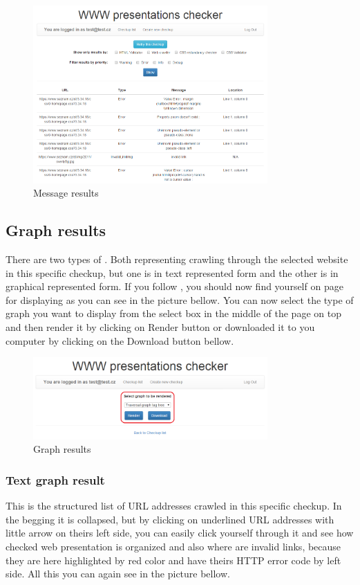 \documentclass[12pt,a4paper]{article}
\begin{document}
\begin{figure}[H]
    \centering
    \includegraphics[width=0.8\textwidth]{pictures/messages.png}
		\caption{Message results}
		\label{fig:messages}
\end{figure}

\subsection{Graph results} \label{graph}
There are two types of . Both representing crawling through the selected website in this specific checkup, but one  is in text represented form and the other  is in graphical represented form. If you follow , you should now find yourself on page for displaying  as you can see in the picture bellow. You can now select the type of graph you want to display from the select box in the middle of the page on top and then render it by clicking on Render button or downloaded it to you computer by clicking on the Download button bellow.

\begin{figure}[H]
    \centering
    \includegraphics[width=0.8\textwidth]{pictures/graph.png}
		\caption{Graph results}
		\label{fig:graph}
\end{figure}

\subsubsection{Text graph result} \label{text}
This is the structured list of URL addresses crawled in this specific checkup. In the begging it is collapsed, but by clicking on underlined URL addresses with little arrow on theirs left side, you can easily click yourself through it and see how checked web presentation is organized and also where are invalid links, because they are here highlighted by red color and have theirs HTTP error code by left side. All this you can again see in the picture bellow.
\end{document}
